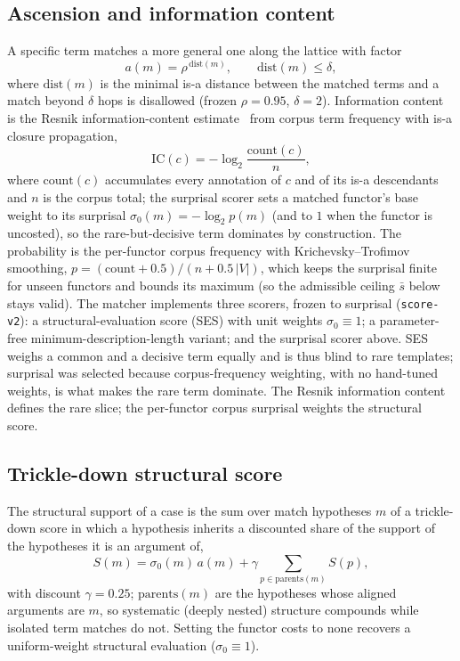 \documentclass[pdflatex,sn-nature]{sn-jnl}
\begin{document}
\subsection{Ascension and information content}
 A specific term matches a more
general one along the lattice with factor
\begin{equation}
a(m)=\rho^{\,\mathrm{dist}(m)},\qquad \mathrm{dist}(m)\le\delta,
\end{equation}
where $\mathrm{dist}(m)$ is the minimal is-a distance between the matched terms
and a match beyond $\delta$ hops is disallowed (frozen $\rho{=}0.95$,
$\delta{=}2$). Information content is the Resnik information-content
estimate~\cite{resnik1995} from corpus term
frequency with is-a closure propagation,
\begin{equation}
\mathrm{IC}(c)=-\log_2\!\frac{\mathrm{count}(c)}{n},
\end{equation}
where $\mathrm{count}(c)$ accumulates every annotation of $c$ and of its is-a
descendants and $n$ is the corpus total; the surprisal scorer sets a matched
functor's base weight to its surprisal $\sigma_0(m)=-\log_2 p(m)$ (and to $1$
when the functor is uncosted), so the rare-but-decisive term dominates by
construction. The probability is the per-functor corpus frequency with
Krichevsky--Trofimov smoothing, $p=(\mathrm{count}+0.5)/(n+0.5\,|V|)$, which keeps
the surprisal finite for unseen functors and bounds its maximum (so the admissible
ceiling $\bar s$ below stays valid). The matcher implements three scorers, frozen
to surprisal (\texttt{score-v2}): a structural-evaluation score (SES) with unit
weights $\sigma_0\equiv1$; a parameter-free minimum-description-length variant; and
the surprisal scorer above. SES weighs a common and a decisive term equally and is
thus blind to rare templates; surprisal was selected because corpus-frequency
weighting, with no hand-tuned weights, is what makes the rare term dominate. The
Resnik information content defines the rare slice; the per-functor corpus surprisal
weights the structural score.

\subsection{Trickle-down structural score}
 The structural support of a case is the
sum over match hypotheses $m$ of a trickle-down score in which a hypothesis
inherits a discounted share of the support of the hypotheses it is an argument
of,
\begin{equation}
S(m)=\sigma_0(m)\,a(m)+\gamma\!\!\sum_{p\in\mathrm{parents}(m)}\!\!S(p),
\end{equation}
with discount $\gamma{=}0.25$; $\mathrm{parents}(m)$ are the hypotheses whose
aligned arguments are $m$, so systematic (deeply nested) structure compounds
while isolated term matches do not. Setting the functor costs to none recovers a
uniform-weight structural evaluation ($\sigma_0\equiv1$).
\end{document}
